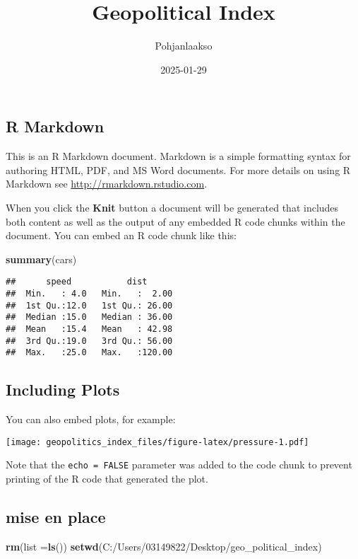 \documentclass[
]{article}
\title{Geopolitical Index}
\author{Pohjanlaakso}
\date{2025-01-29}
\newenvironment{Shaded}{\begin{snugshade}}{\end{snugshade}}
\newcommand{\AttributeTok}[1]{\textcolor[rgb]{0.13,0.29,0.53}{#1}}
\newcommand{\FunctionTok}[1]{\textcolor[rgb]{0.13,0.29,0.53}{\textbf{#1}}}
\newcommand{\NormalTok}[1]{#1}
\newcommand{\StringTok}[1]{\textcolor[rgb]{0.31,0.60,0.02}{#1}}
\begin{document}
\maketitle

\subsection{R Markdown}\label{r-markdown}

This is an R Markdown document. Markdown is a simple formatting syntax
for authoring HTML, PDF, and MS Word documents. For more details on
using R Markdown see \url{http://rmarkdown.rstudio.com}.

When you click the \textbf{Knit} button a document will be generated
that includes both content as well as the output of any embedded R code
chunks within the document. You can embed an R code chunk like this:

\begin{Shaded}
\begin{Highlighting}[]
\FunctionTok{summary}\NormalTok{(cars)}
\end{Highlighting}
\end{Shaded}

\begin{verbatim}
##      speed           dist       
##  Min.   : 4.0   Min.   :  2.00  
##  1st Qu.:12.0   1st Qu.: 26.00  
##  Median :15.0   Median : 36.00  
##  Mean   :15.4   Mean   : 42.98  
##  3rd Qu.:19.0   3rd Qu.: 56.00  
##  Max.   :25.0   Max.   :120.00
\end{verbatim}

\subsection{Including Plots}\label{including-plots}

You can also embed plots, for example:

\texttt{[image: geopolitics\_index\_files/figure-latex/pressure-1.pdf]}

Note that the \texttt{echo\ =\ FALSE} parameter was added to the code
chunk to prevent printing of the R code that generated the plot.

\subsection{mise en place}\label{mise-en-place}

\begin{Shaded}
\begin{Highlighting}[]
\FunctionTok{rm}\NormalTok{(}\AttributeTok{list =}\FunctionTok{ls}\NormalTok{())}
\FunctionTok{setwd}\NormalTok{(}\StringTok{\textquotesingle{}C:/Users/03149822/Desktop/geo\_political\_index\textquotesingle{}}\NormalTok{)}
\end{Highlighting}
\end{Shaded}
\end{document}
